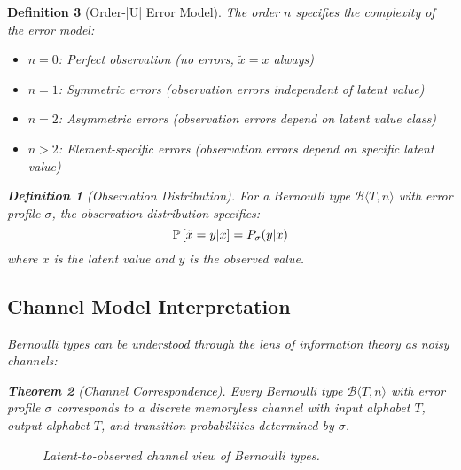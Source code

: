 \documentclass[11pt,final,hidelinks]{article}
\newtheorem{theorem}{Theorem}[section]
\newtheorem{definition}[theorem]{Definition}
\newcommand{\bernoulli}[2]{\mathcal{B}\langle #1, #2 \rangle}
\begin{document}
\begin{definition}[Order-|U| Error Model]
The order $n$ specifies the complexity of the error model:
\begin{itemize}
    \item $n = 0$: Perfect observation (no errors, $\tilde{x} = x$ always)
    \item $n = 1$: Symmetric errors (observation errors independent of latent value)
    \item $n = 2$: Asymmetric errors (observation errors depend on latent value class)
    \item $n > 2$: Element-specific errors (observation errors depend on specific latent value)
\end{itemize}

\begin{definition}[Observation Distribution]
For a Bernoulli type $\bernoulli{T}{n}$ with error profile $\sigma$, the observation distribution specifies:
\begin{equation}
\mathbb{P}\left[\tilde{x} = y | x\right] = P_\sigma(y|x)
\end{equation}
where $x$ is the latent value and $y$ is the observed value.
\end{definition}

\subsection{Channel Model Interpretation}

Bernoulli types can be understood through the lens of information theory as noisy channels:

\begin{theorem}[Channel Correspondence]
Every Bernoulli type $\bernoulli{T}{n}$ with error profile $\sigma$ corresponds to a discrete memoryless channel with input alphabet $T$, output alphabet $T$, and transition probabilities determined by $\sigma$.
\end{theorem}

\begin{figure}[t]
\centering
{}
\caption{Latent-to-observed channel view of Bernoulli types.}
\end{figure}


\end{definition}
\end{document}
